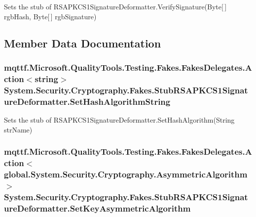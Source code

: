 Sets the stub of R\-S\-A\-P\-K\-C\-S1\-Signature\-Deformatter.\-Verify\-Signature(\-Byte\mbox{[}$\,$\mbox{]} rgb\-Hash, Byte\mbox{[}$\,$\mbox{]} rgb\-Signature)



\subsection{Member Data Documentation}
\hypertarget{class_system_1_1_security_1_1_cryptography_1_1_fakes_1_1_stub_r_s_a_p_k_c_s1_signature_deformatter_ae90f4a43bc3f7d4a3415aaeb90e1023f}{
\subsubsection[{Set\-Hash\-Algorithm\-String}]{\setlength{\rightskip}{0pt plus 5cm}mqttf.\-Microsoft.\-Quality\-Tools.\-Testing.\-Fakes.\-Fakes\-Delegates.\-Action$<$string$>$ System.\-Security.\-Cryptography.\-Fakes.\-Stub\-R\-S\-A\-P\-K\-C\-S1\-Signature\-Deformatter.\-Set\-Hash\-Algorithm\-String}}\label{class_system_1_1_security_1_1_cryptography_1_1_fakes_1_1_stub_r_s_a_p_k_c_s1_signature_deformatter_ae90f4a43bc3f7d4a3415aaeb90e1023f}


Sets the stub of R\-S\-A\-P\-K\-C\-S1\-Signature\-Deformatter.\-Set\-Hash\-Algorithm(\-String str\-Name)

\hypertarget{class_system_1_1_security_1_1_cryptography_1_1_fakes_1_1_stub_r_s_a_p_k_c_s1_signature_deformatter_aab350e2129afd7b8744a973e00a29fac}{
\subsubsection[{Set\-Key\-Asymmetric\-Algorithm}]{\setlength{\rightskip}{0pt plus 5cm}mqttf.\-Microsoft.\-Quality\-Tools.\-Testing.\-Fakes.\-Fakes\-Delegates.\-Action$<$global.\-System.\-Security.\-Cryptography.\-Asymmetric\-Algorithm$>$ System.\-Security.\-Cryptography.\-Fakes.\-Stub\-R\-S\-A\-P\-K\-C\-S1\-Signature\-Deformatter.\-Set\-Key\-Asymmetric\-Algorithm}}\label{class_system_1_1_security_1_1_cryptography_1_1_fakes_1_1_stub_r_s_a_p_k_c_s1_signature_deformatter_aab350e2129afd7b8744a973e00a29fac}


